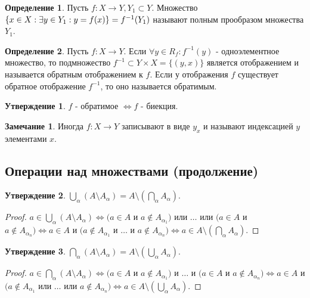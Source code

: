 \documentclass[a4paper, 12pt]{article}
\newcommand{\lra}{\Leftrightarrow}
\theoremstyle{definition}
\newtheorem*{definition}{Определение}
\newtheorem*{comm}{Замечание}
\newtheorem*{statement}{Утверждение}
\begin{document}
        \begin{definition}
            Пусть $f:X\to Y, Y_1\subset Y$. Множество $\{x\in X: \exists y\in Y_1 : \\ y=f(x)\}=f^{-1}(Y_1)$ называют полным прообразом множества $Y_1$.
        \end{definition}
        \begin{definition}
            Пусть $f:X\to Y$. Если $\forall y\in R_f: f^{-1}(y)$ - одноэлементное множество, то подмножество $f^{-1}\subset Y\times X=\{(y,x)\}$ является отображением и называется обратным отображением к $f$. Если у отображения $f$ существует обратное отображение $f^{-1}$, то оно называется обратимым.
        \end{definition}
        \begin{statement}
            $f$ - обратимое $\lra f$ - биекция.
        \end{statement}
        \begin{comm}
        Иногда $f: X\to Y$ записывают в виде $y_x$ и называют индексацией $y$ элементами $x$.
        \end{comm}
    \subsection{Операции над множествами (продолжение)}
        \begin{statement}
            $\bigcup\limits_{\alpha}(A\setminus A_{\alpha}) = A\setminus (\bigcap\limits_{\alpha}A_{\alpha})$.
        \end{statement}
        \begin{proof}
            $a\in \bigcup\limits_{\alpha}(A\setminus A_{\alpha})\lra (a\in A$ и $a\notin A_{\alpha_1})$ или $\dots$ или $(a\in A$ и $a\notin A_{\alpha_n})\lra a\in A$ и $(a\notin A_{\alpha_1}$ и $\dots$ и $a\notin A_{\alpha_n})\lra a\in A\setminus (\bigcap\limits_{\alpha}A_{\alpha})$.
        \end{proof}
        \begin{statement}
            $\bigcap\limits_{\alpha}(A\setminus A_{\alpha}) = A\setminus (\bigcup\limits_{\alpha}A_{\alpha})$.
        \end{statement}
        \begin{proof}
            $a\in \bigcap\limits_{\alpha}(A\setminus A_{\alpha})\lra (a\in A$ и $a\notin A_{\alpha_1})$ и $\dots$ и $(a\in A$ и $a\notin A_{\alpha_n})\lra a\in A$ и $(a\notin A_{\alpha_1}$ или $\dots$ или $a\notin A_{\alpha_n})\lra a\in A\setminus (\bigcup\limits_{\alpha}A_{\alpha})$.
        \end{proof}
\end{document}
